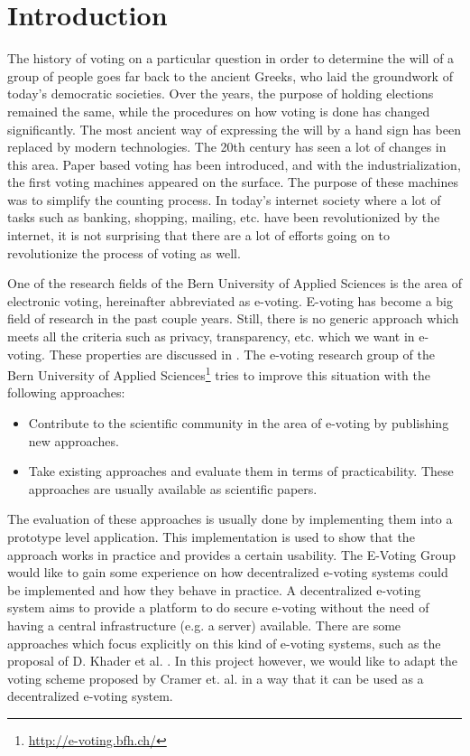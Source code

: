 \documentclass[numbers=noenddot, abstract=on, a4paper, headsepline,
footsepline, oneside, openright, draft=off, listof=leveldown]{scrreprt}
\begin{document}
\chapter{Introduction}
\label{cha:introduction}
The history of voting on a particular question in order to determine the will of
a group of people goes far back to the ancient Greeks, who laid the groundwork of
today's democratic societies. Over the years, the purpose of holding elections
remained the same, while the procedures on how voting is done has changed
significantly. The most ancient way of expressing the will by a hand sign has
been replaced by modern technologies. The 20th century has seen a lot of changes
in this area. Paper based voting has been introduced, and with the
industrialization, the first voting machines appeared on the surface. The
purpose of these machines was to simplify the counting process. In today's internet
society where a lot of tasks such as banking, shopping, mailing, etc. have been
revolutionized by the internet, it is not surprising that there are a lot of
efforts going on to revolutionize the process of voting as well.

One of the research fields of the Bern University of Applied Sciences is the
area of electronic voting, hereinafter abbreviated as e-voting. E-voting has
become a big field of research in the past couple years. Still, there is no
generic approach which meets all the criteria such as privacy, transparency,
etc. which we want in e-voting. These properties are discussed in
. The e-voting research group of the Bern University of
Applied Sciences\footnote{\url{http://e-voting.bfh.ch/}} tries to improve this
situation with the following approaches:
\begin{itemize}
  \item Contribute to the scientific community in the area of e-voting by
  publishing new approaches.
  \item Take existing approaches and evaluate them in terms of practicability.
  These approaches are usually available as scientific papers.
\end{itemize}

The evaluation of these approaches is usually done by implementing them into a
prototype level application. This implementation is used to show that the
approach works in practice and provides a certain usability. The E-Voting Group
would like to gain some experience on how decentralized e-voting systems could
be implemented and how they behave in practice. A decentralized e-voting system
aims to provide a platform to do secure e-voting without the need of having a
central infrastructure (e.g. a server) available. There are some approaches which
focus explicitly on this kind of e-voting systems, such as the proposal of D.
Khader et al. \cite{HKRS12}. In this project however, we would like to adapt the
voting scheme proposed by Cramer et. al. \cite{CGS97} in a way that it can be
used as a decentralized e-voting system.
\end{document}
